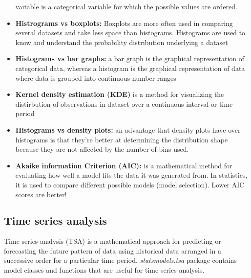 \documentclass[
  letterpaper,
]{book}
\begin{document}
\begin{itemize}
  variable is a categorical variable for which the possible values are
  ordered.
\item
  \textbf{Histrograms vs boxplots:} Boxplots are more often used in
  comparing several datasets and take less space than histograms.
  Histograms are used to know and understand the probability
  distribution underlying a dataset
\item
  \textbf{Histograms vs bar graphs:} a bar graph is the graphical
  representation of categorical data, whereas a histogram is the
  graphical representation of data where data is grouped into continuous
  number ranges
\item
  \textbf{Kernel density estimation (KDE)} is a method for visualizing
  the distirbution of observations in dataset over a continuous interval
  or time period
\item
  \textbf{Histograms vs density plots:} an advantage that density plots
  have over histograms is that they're better at determining the
  distribution shape because they are not affected by the number of bins
  used.
\item
  \textbf{Akaike information Criterion (AIC):} is a mathematical method
  for evaluating how well a model fits the data it was generated from.
  In statistics, it is used to compare different possible models (model
  selection). Lower AIC scores are better!
\end{itemize}

\hypertarget{time-series-analysis}{%
\subsection{Time series analysis}\label{time-series-analysis}}

Time series analysis (TSA) is a mathematical approach for predicting or
forecasting the future pattern of data using historical data arranged in
a successive order for a particular time period. \emph{statsmodels.tsa}
package contains model classes and functions that are useful for time
series analysis.
\end{document}
